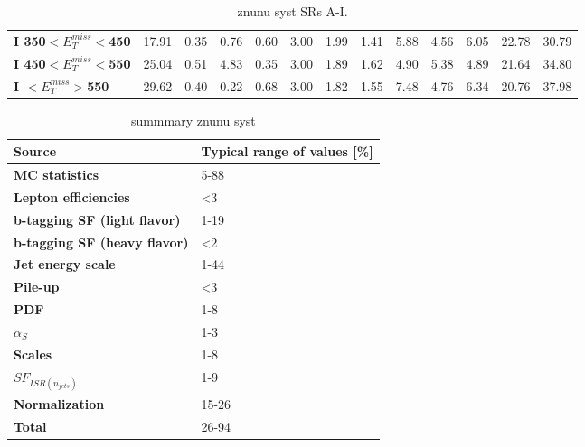 \begin{table}[h]
\begin{center}
{\begin{tabular}{|l|cccccccccccc|}
\textbf{ I 350$<E_T^{miss}<$450}         & 17.91         & 0.35          & 0.76          & 0.60          & 3.00          & 1.99          & 1.41          & 5.88          & 4.56          & 6.05          & 22.78         & 30.79         \\
\textbf{ I 450$<E_T^{miss}<$550}         & 25.04         & 0.51          & 4.83          & 0.35          & 3.00          & 1.89          & 1.62          & 4.90          & 5.38          & 4.89          & 21.64         & 34.80         \\
\textbf{ I $<E_T^{miss}>$550}    & 29.62         & 0.40          & 0.22          & 0.68          & 3.00          & 1.82          & 1.55          & 7.48          & 4.76          & 6.34          & 20.76         & 37.98         \\
\hline
\end{tabular}}
\caption[Table caption text]{znunu syst SRs A-I. }
\label{tab:SysZnunu}
\end{center}
\end{table}


\begin{table}[h]
\begin{center}
\begin{tabular}{|l|l|}
\hline
\textbf{Source}       & \textbf{Typical range of values} [\%]                       \\
\hline
\textbf{MC statistics}      &  5-88   \\
\hline
\textbf{Lepton efficiencies}              &  <3  \\
\textbf{b-tagging SF (light flavor)}      &  1-19  \\
\textbf{b-tagging SF (heavy flavor)}      &  <2  \\
\textbf{Jet energy scale}                 &  1-44  \\
\textbf{Pile-up}                          &  <3  \\
\hline
\textbf{PDF}                 &  1-8  \\
\textbf{$\alpha_{S}$}                 &  1-3  \\
\textbf{Scales}                 &  1-8  \\
\textbf{$SF_{ISR(n_{jets})}$}                 &  1-9  \\
\textbf{Normalization}                 &  15-26  \\
\hline
\textbf{Total}                 &  26-94  \\
\hline
\end{tabular}
\caption[Table caption text]{summmary znunu syst }
\label{tab:SysZnunuSum}
\end{center}
\end{table}

